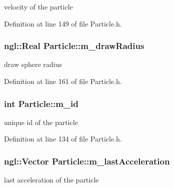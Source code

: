 velocity of the particle 



Definition at line 149 of file Particle.h.

\hypertarget{class_particle_a680993dfd34187f6fb392b54761b285d}{
\subsubsection[{m\_\-drawRadius}]{\setlength{\rightskip}{0pt plus 5cm}ngl::Real {\bf Particle::m\_\-drawRadius}}}
\label{class_particle_a680993dfd34187f6fb392b54761b285d}


draw sphere radius 



Definition at line 161 of file Particle.h.

\hypertarget{class_particle_a24c5edf015f4c3d067acf1a054f31f93}{
\subsubsection[{m\_\-id}]{\setlength{\rightskip}{0pt plus 5cm}int {\bf Particle::m\_\-id}}}
\label{class_particle_a24c5edf015f4c3d067acf1a054f31f93}


unique id of the particle 



Definition at line 134 of file Particle.h.

\hypertarget{class_particle_a352c3a71df0b2dc011808e8fc0ace062}{
\subsubsection[{m\_\-lastAcceleration}]{\setlength{\rightskip}{0pt plus 5cm}ngl::Vector {\bf Particle::m\_\-lastAcceleration}}}
\label{class_particle_a352c3a71df0b2dc011808e8fc0ace062}


last acceleration of the particle 



